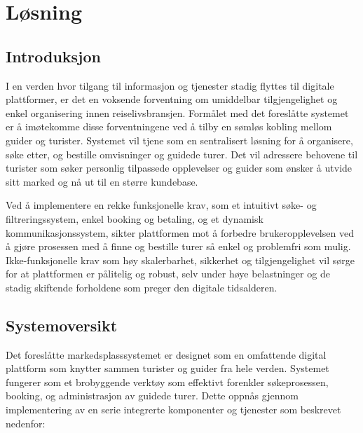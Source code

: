 \documentclass[../doc.tex]{subfiles}
\begin{document}
\section{Løsning}
\subsection{Introduksjon}
I en verden hvor tilgang til informasjon og tjenester stadig flyttes til digitale plattformer, er det en voksende forventning om umiddelbar tilgjengelighet og enkel organisering innen reiselivsbransjen. 
Formålet med det foreslåtte systemet er å imøtekomme disse forventningene ved å tilby en sømløs kobling mellom guider og turister. 
Systemet vil tjene som en sentralisert løsning for å organisere, søke etter, og bestille omvisninger og guidede turer. 
Det vil adressere behovene til turister som søker personlig tilpassede opplevelser og guider som ønsker å utvide sitt marked og nå ut til en større kundebase.

Ved å implementere en rekke funksjonelle krav, som et intuitivt søke- og filtreringssystem, enkel booking og betaling, og et dynamisk kommunikasjonssystem, sikter plattformen mot å forbedre brukeropplevelsen ved å gjøre prosessen med å finne og bestille turer så enkel og problemfri som mulig. 
Ikke-funksjonelle krav som høy skalerbarhet, sikkerhet og tilgjengelighet vil sørge for at plattformen er pålitelig og robust, selv under høye belastninger og de stadig skiftende forholdene som preger den digitale tidsalderen.

\subsection{Systemoversikt}
Det foreslåtte markedsplasssystemet er designet som en omfattende digital plattform som knytter sammen turister og guider fra hele verden. 
Systemet fungerer som et brobyggende verktøy som effektivt forenkler søkeprosessen, booking, og administrasjon av guidede turer. 
Dette oppnås gjennom implementering av en serie integrerte komponenter og tjenester som beskrevet nedenfor:
\end{document}

